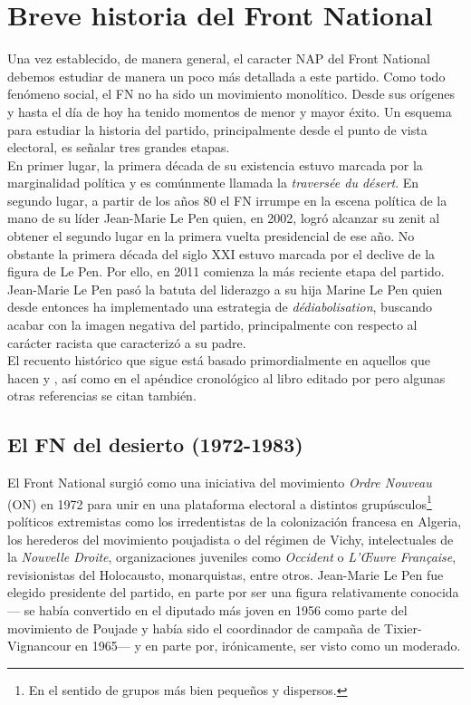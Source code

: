 \chapter{Breve historia del Front National}

Una vez establecido, de manera general, el caracter NAP del Front National debemos estudiar de manera un poco más detallada a este partido. Como todo fenómeno social, el FN no ha sido un movimiento monolítico. Desde sus orígenes y hasta el día de hoy ha tenido momentos de menor y mayor éxito. Un esquema para estudiar la historia del partido, principalmente desde el punto de vista electoral, es señalar tres grandes etapas.\\ 

En primer lugar, la primera década de su existencia estuvo marcada por la marginalidad política y es comúnmente llamada la \textit{traversée du désert}. En segundo lugar, a partir de los años 80 el FN irrumpe en la escena política de la mano de su líder Jean-Marie Le Pen quien, en 2002, logró alcanzar su zenit al obtener el segundo lugar en la primera vuelta presidencial de ese año. No obstante la primera década del siglo XXI estuvo marcada por el declive de la figura de Le Pen. Por ello, en 2011 comienza la más reciente etapa del partido. Jean-Marie Le Pen pasó la batuta del liderazgo a su hija Marine Le Pen quien desde entonces ha implementado una estrategia de \textit{dédiabolisation}, buscando acabar con la imagen negativa del partido, principalmente con respecto al carácter racista que caracterizó a su padre.\\ 

El recuento histórico que sigue está basado primordialmente en aquellos que hacen \textcite{Hainsworth16b} y \textcite{Stockemer17}, así como en el apéndice cronológico al libro editado por \textcite{CreponEtAl15} pero algunas otras referencias se citan también.

\section{El FN del desierto (1972-1983)}

El Front National surgió como una iniciativa del movimiento \textit{Ordre Nouveau} (ON) en 1972 para unir en una plataforma electoral a distintos grupúsculos\footnote{En el sentido de grupos más bien pequeños y dispersos.} políticos extremistas como los irredentistas de la colonización francesa en Algeria, los herederos del movimiento poujadista o del régimen de Vichy, intelectuales de la \textit{Nouvelle Droite}, organizaciones juveniles como \textit{Occident} o \textit{L'\OE{}uvre Française}, revisionistas del Holocausto, monarquistas, entre otros. Jean-Marie Le Pen fue elegido presidente del partido, en parte por ser una figura relativamente conocida--- se había convertido en el diputado más joven en 1956 como parte del movimiento de Poujade y había sido el coordinador de campaña de Tixier-Vignancour en 1965--- y en parte por, irónicamente, ser visto como un moderado.\\ 

